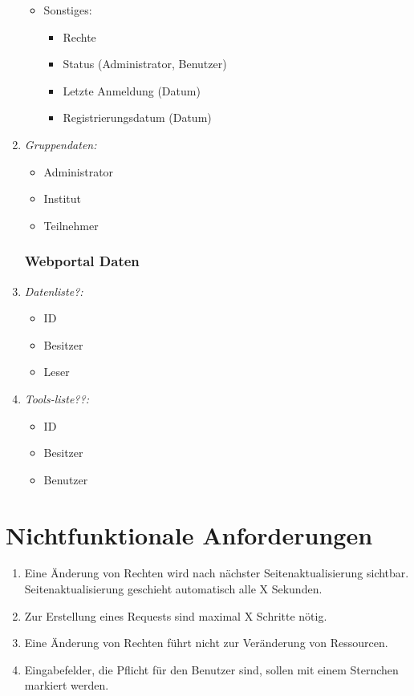 \documentclass[parskip=full,11pt]{scrartcl}
\def\threedigits#1{%
  \ifnum#1<10 0\fi
  \ifnum#1<1 0\fi
  \number#1}
\begin{document}
\begin{enumerate}[label={\textbf{/D\protect\threedigits{\theenumi}0/}}, leftmargin=*]
\begin{itemize}
    \item Sonstiges:
   \begin{itemize}
     \item Rechte
     \item Status (Administrator, Benutzer) 
     \item Letzte Anmeldung (Datum) 
     \item Registrierungsdatum (Datum)    
   \end{itemize}
 
\end{itemize}

\item \textit{Gruppendaten:}
\begin{itemize}
\item Administrator
\item Institut
\item Teilnehmer
 \end{itemize}
 
\subsubsection{Webportal Daten}
\item \textit{Datenliste?:}
\begin{itemize}
\item ID
\item Besitzer
\item Leser
 \end{itemize}
 
 \item \textit{Tools-liste??:}
\begin{itemize}
\item ID
\item Besitzer
\item Benutzer
 \end{itemize}

\end{enumerate}
\section{Nichtfunktionale Anforderungen}
\begin{enumerate}[label={\textbf{/NF\protect\threedigits{\theenumi}0/}}, leftmargin=*]
\item Eine Änderung von Rechten wird nach nächster Seitenaktualisierung sichtbar. Seitenaktualisierung geschieht automatisch alle X Sekunden.
\item Zur Erstellung eines Requests sind maximal X Schritte nötig.
\item Eine Änderung von Rechten führt nicht zur Veränderung von Ressourcen.
\item Eingabefelder, die Pflicht für den Benutzer sind, sollen mit einem Sternchen markiert werden.
\end{enumerate}
\end{document}
